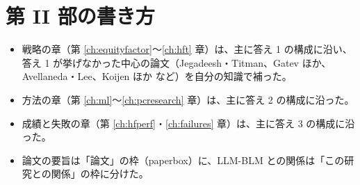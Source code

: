 \section{第 II 部の書き方}

\begin{itemize}
\item 戦略の章（第 \ref{ch:equityfactor}〜\ref{ch:hft} 章）は、主に答え 1 の構成に沿い、答え 1 が挙げなかった中心の論文（Jegadeesh・Titman、Gatev ほか、Avellaneda・Lee、Koijen ほか など）を自分の知識で補った。
\item 方法の章（第 \ref{ch:ml}〜\ref{ch:pcresearch} 章）は、主に答え 2 の構成に沿った。
\item 成績と失敗の章（第 \ref{ch:hfperf}・\ref{ch:failures} 章）は、主に答え 3 の構成に沿った。
\item 論文の要旨は「論文」の枠（\textsf{paperbox}）に、LLM-BLM との関係は「この研究との関係」の枠に分けた。
\end{itemize}
